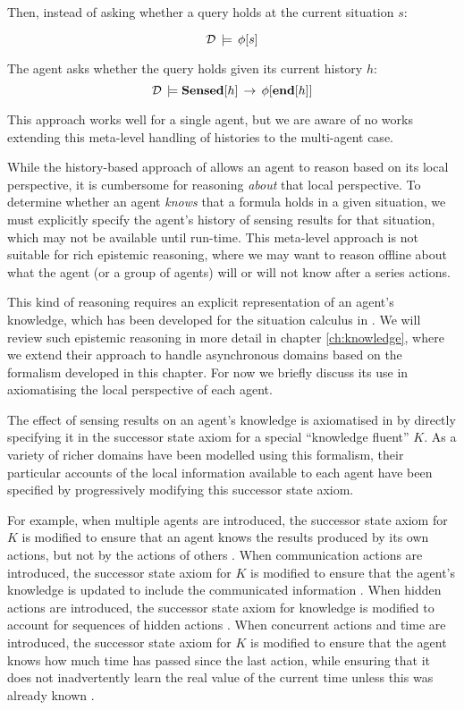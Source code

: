 Then, instead of asking whether a query holds at the current situation
$s$:

\[
\mathcal{D}\,\models\,\phi[s]\]


The agent asks whether the query holds given its current history $h$:\[
\mathcal{D}\,\models\mathbf{Sensed}[h]\,\rightarrow\,\phi[\mathbf{end}[h]]\]


This approach works well for a single agent, but we are aware of no
works extending this meta-level handling of histories to the multi-agent
case.

While the history-based approach of \citep{giacomo99indigolog} allows
an agent to reason based on its local perspective, it is cumbersome
for reasoning \emph{about} that local perspective. To determine whether
an agent \emph{knows} that a formula holds in a given situation, we
must explicitly specify the agent's history of sensing results for
that situation, which may not be available until run-time. This meta-level
approach is not suitable for rich epistemic reasoning, where we may
want to reason offline about what the agent (or a group of agents)
will or will not know after a series actions.

This kind of reasoning requires an explicit representation of an agent's
knowledge, which has been developed for the situation calculus in
\citep{scherl03sc_knowledge}. We will review such epistemic reasoning
in more detail in chapter \ref{ch:knowledge}, where we extend their
approach to handle asynchronous domains based on the formalism developed
in this chapter. For now we briefly discuss its use in axiomatising
the local perspective of each agent.

The effect of sensing results on an agent's knowledge is axiomatised
in \citep{scherl03sc_knowledge} by directly specifying it in the
successor state axiom for a special {}``knowledge fluent'' $K$.
As a variety of richer domains have been modelled using this formalism,
their particular accounts of the local information available to each
agent have been specified by progressively modifying this successor
state axiom.

For example, when multiple agents are introduced, the successor state
axiom for $K$ is modified to ensure that an agent knows the results
produced by its own actions, but not by the actions of others \citep{shapiro98specifying_ma_systems}.
When communication actions are introduced, the successor state axiom
for $K$ is modified to ensure that the agent's knowledge is updated
to include the communicated information \citep{shapiro98specifying_ma_systems}.
When hidden actions are introduced, the successor state axiom for
knowledge is modified to account for sequences of hidden actions \citep{Lesperance99sitcalc_approach}.
When concurrent actions and time are introduced, the successor state
axiom for $K$ is modified to ensure that the agent knows how much
time has passed since the last action, while ensuring that it does
not inadvertently learn the real value of the current time unless
this was already known \citep{scherl03conc_knowledge}.

